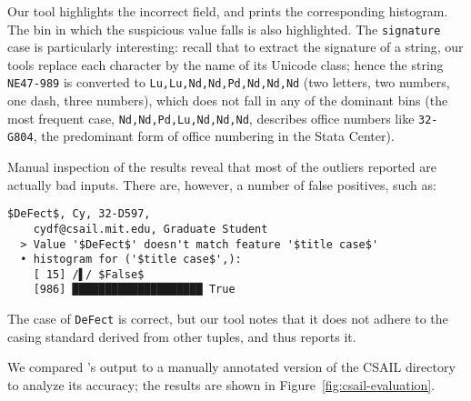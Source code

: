 Our tool highlights the incorrect field, and prints the corresponding histogram. The bin in which the suspicious value falls is also highlighted. The \texttt{signature} case is particularly interesting: recall that to extract the signature of a string, our tools replace each character by the name of its Unicode class; hence the string \texttt{NE47-989} is converted to \lstinline{Lu,Lu,Nd,Nd,Pd,Nd,Nd,Nd} (two letters, two numbers, one dash, three numbers), which does not fall in any of the dominant bins (the most frequent case, \lstinline{Nd,Nd,Pd,Lu,Nd,Nd,Nd}, describes office numbers like \lstinline{32-G804}, the predominant form of office numbering in the Stata Center).

Manual inspection of the results reveal that most of the outliers reported are actually bad inputs. There are, however, a number of false positives, such as:

\begin{lstlisting}[gobble=2]
  $DeFect$, Cy, 32-D597,
    cydf@csail.mit.edu, Graduate Student
  > Value '$DeFect$' doesn't match feature '$title case$'
  • histogram for ('$title case$',):
    [ 15] /▌/ $False$
    [986] ████████████████████ True
\end{lstlisting}

The case of \lstinline{DeFect} is correct, but our tool notes that it does not adhere to the casing standard derived from other tuples, and thus reports it.

We compared \dBoost's output to a manually annotated version of the CSAIL directory to analyze its accuracy; the results are shown in Figure~\ref{fig:csail-evaluation}.
